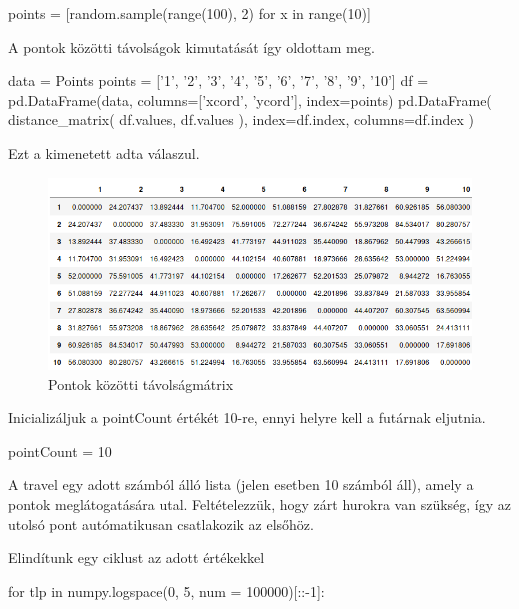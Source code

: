 \begin{python}
points = [random.sample(range(100), 2) for x in range(10)]
\end{python}

A pontok közötti távolságok kimutatását így oldottam meg.

\begin{python}
data = Points
points = ['1', '2', '3', '4', '5', '6', '7', '8', '9', '10']
df = pd.DataFrame(data, columns=['xcord', 'ycord'], index=points)
pd.DataFrame(
	distance_matrix(
		df.values, 
		df.values
	), 
	index=df.index,
	columns=df.index
)
\end{python}

Ezt a kimenetett adta válaszul.

\begin{figure}[h!]
\centering
\includegraphics[width=\textwidth]{images/table.png}
\caption{Pontok közötti távolságmátrix}
\label{fig:kimenet}
\end{figure}

Inicializáljuk a pointCount értékét 10-re, ennyi helyre kell a futárnak eljutnia.

\begin{python}
pointCount = 10
\end{python}

A travel egy adott számból álló lista (jelen esetben 10 számból áll), amely a pontok meglátogatására utal. Feltételezzük, hogy zárt hurokra van szükség, így az utolsó pont autómatikusan csatlakozik az elsőhöz.


\begin{python}
travel = random.sample(range(pointCount), pointCount);}
\end{python}

Elindítunk egy ciklust az adott értékekkel


\begin{python}
for tlp in numpy.logspace(0, 5, num = 100000)[::-1]:
\end{python}


